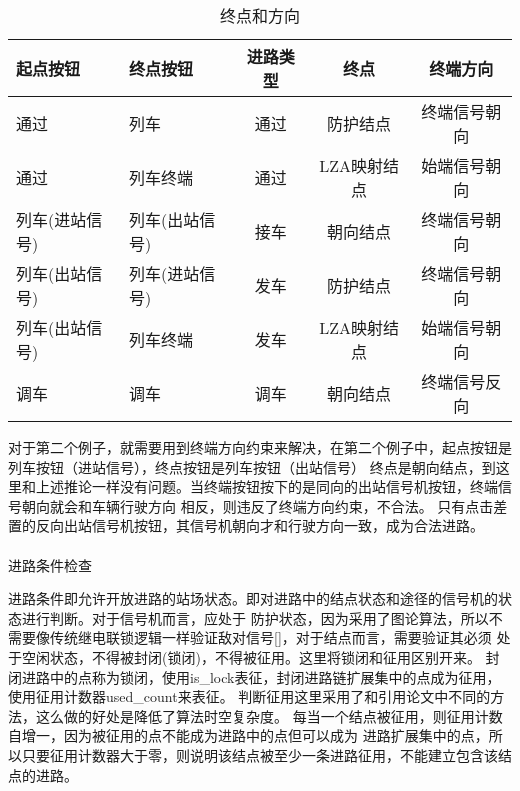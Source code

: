\begin{table}[htpb!]
    \centering
    \caption{\label{route_end}终点和方向}
    \begin{threeparttable}
        \begin{tabular}{llccc}
            \toprule
            起点按钮       & 终点按钮       & 进路类型 & 终点        & 终端方向     \\
            \midrule
            通过           & 列车           & 通过     & 防护结点    & 终端信号朝向 \\
            通过           & 列车终端       & 通过     & LZA映射结点 & 始端信号朝向 \\
            列车(进站信号) & 列车(出站信号) & 接车     & 朝向结点    & 终端信号朝向 \\
            列车(出站信号) & 列车(进站信号) & 发车     & 防护结点    & 终端信号朝向 \\
            列车(出站信号) & 列车终端       & 发车     & LZA映射结点 & 始端信号朝向 \\
            调车           & 调车           & 调车     & 朝向结点    & 终端信号反向 \\
            \bottomrule
        \end{tabular}
    \end{threeparttable}
\end{table}

对于第二个例子，就需要用到终端方向约束来解决，在第二个例子中，起点按钮是列车按钮（进站信号），终点按钮是列车按钮（出站信号）
终点是朝向结点，到这里和上述推论一样没有问题。当终端按钮按下的是同向的出站信号机按钮，终端信号朝向就会和车辆行驶方向
相反，则违反了终端方向约束，不合法。
只有点击差置的反向出站信号机按钮，其信号机朝向才和行驶方向一致，成为合法进路。

\paragraph{}进路条件检查

进路条件即允许开放进路的站场状态。即对进路中的结点状态和途径的信号机的状态进行判断。对于信号机而言，应处于
防护状态，因为采用了图论算法，所以不需要像传统继电联锁逻辑一样验证敌对信号[]，对于结点而言，需要验证其必须
处于空闲状态，不得被封闭(锁闭)，不得被征用。这里将锁闭和征用区别开来。
封闭进路中的点称为锁闭，使用is\_lock表征，封闭进路链扩展集中的点成为征用，使用征用计数器used\_count来表征。
判断征用这里采用了和引用论文中不同的方法，这么做的好处是降低了算法时空复杂度。
每当一个结点被征用，则征用计数自增一，因为被征用的点不能成为进路中的点但可以成为
进路扩展集中的点，所以只要征用计数器大于零，则说明该结点被至少一条进路征用，不能建立包含该结点的进路。

